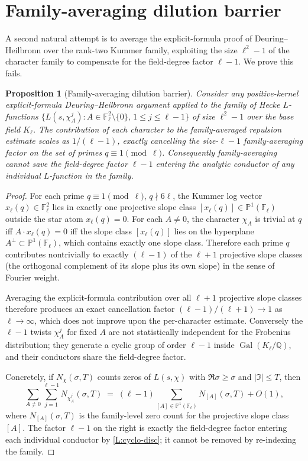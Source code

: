\documentclass[11pt]{article}
\newtheorem{proposition}{Proposition}
\newcommand{\Q}{\mathbb Q}
\newcommand{\F}{\mathbb F}
\newcommand{\Pj}{\mathbb P}
\newcommand{\Gal}{\operatorname{Gal}}
\begin{document}
\section{Family-averaging dilution barrier}

A second natural attempt is to average the explicit-formula proof of Deuring--Heilbronn over the rank-two Kummer family, exploiting the size \(\ell^2-1\) of the character family to compensate for the field-degree factor \(\ell-1\).  We prove this fails.

\begin{proposition}[Family-averaging dilution barrier]\label{P:family-dilution}
Consider any positive-kernel explicit-formula Deuring--Heilbronn argument applied to the family of Hecke \(L\)-functions \(\{L(s,\chi_A^j)\colon A\in\F_\ell^2\setminus\{0\},\,1\le j\le\ell-1\}\) of size \(\ell^2-1\) over the base field \(K_\ell\).  The contribution of each character to the family-averaged repulsion estimate scales as \(1/(\ell-1)\), exactly cancelling the size-\(\ell-1\) family-averaging factor on the set of primes \(q\equiv 1\pmod\ell\).  Consequently family-averaging cannot save the field-degree factor \(\ell-1\) entering the analytic conductor of any individual \(L\)-function in the family.
\end{proposition}

\begin{proof}
For each prime \(q\equiv 1\pmod\ell\), \(q\nmid 6\ell\), the Kummer log vector \(x_\ell(q)\in\F_\ell^2\) lies in exactly one projective slope class \([x_\ell(q)]\in\Pj^1(\F_\ell)\) outside the star atom \(x_\ell(q)=0\).  For each \(A\ne 0\), the character \(\chi_A\) is trivial at \(q\) iff \(A\cdot x_\ell(q)=0\) iff the slope class \([x_\ell(q)]\) lies on the hyperplane \(A^\perp\subset\Pj^1(\F_\ell)\), which contains exactly one slope class.  Therefore each prime \(q\) contributes nontrivially to exactly \((\ell-1)\) of the \(\ell+1\) projective slope classes (the orthogonal complement of its slope plus its own slope) in the sense of Fourier weight.

Averaging the explicit-formula contribution over all \(\ell+1\) projective slope classes therefore produces an exact cancellation factor \((\ell-1)/(\ell+1)\to 1\) as \(\ell\to\infty\), which does not improve upon the per-character estimate.  Conversely the \(\ell-1\) twists \(\chi_A^j\) for fixed \(A\) are not statistically independent for the Frobenius distribution; they generate a cyclic group of order \(\ell-1\) inside \(\widehat{\Gal(K_\ell/\Q)}\), and their conductors share the field-degree factor.

Concretely, if \(N_\chi(\sigma,T)\) counts zeros of \(L(s,\chi)\) with \(\Re\sigma\ge\sigma\) and \(|\Im|\le T\), then
\[
\sum_{A\ne 0}\sum_{j=1}^{\ell-1}N_{\chi_A^j}(\sigma,T)\;=\;(\ell-1)\sum_{[A]\in\Pj^1(\F_\ell)}N_{[A]}(\sigma,T)+O(1),
\]
where \(N_{[A]}(\sigma,T)\) is the family-level zero count for the projective slope class \([A]\).  The factor \(\ell-1\) on the right is exactly the field-degree factor entering each individual conductor by \cref{L:cyclo-disc}; it cannot be removed by re-indexing the family.
\end{proof}
\end{document}
